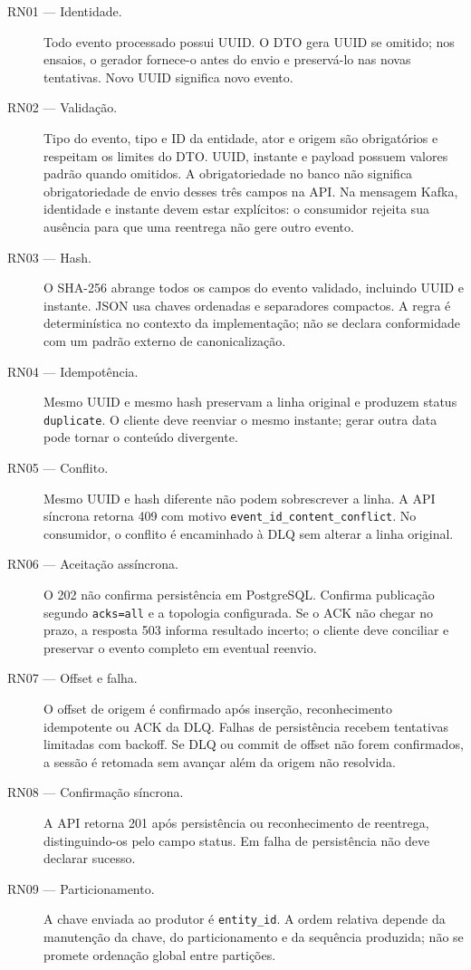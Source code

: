 \begin{description}
\item[RN01 --- Identidade.] Todo evento processado possui UUID. O DTO gera UUID se omitido; nos ensaios, o gerador fornece-o antes do envio e preservá-lo nas novas tentativas. Novo UUID significa novo evento.
\item[RN02 --- Validação.] Tipo do evento, tipo e ID da entidade, ator e origem são obrigatórios e respeitam os limites do DTO. UUID, instante e payload possuem valores padrão quando omitidos. A obrigatoriedade no banco não significa obrigatoriedade de envio desses três campos na API. Na mensagem Kafka, identidade e instante devem estar explícitos: o consumidor rejeita sua ausência para que uma reentrega não gere outro evento.
\item[RN03 --- Hash.] O SHA-256 abrange todos os campos do evento validado, incluindo UUID e instante. JSON usa chaves ordenadas e separadores compactos. A regra é determinística no contexto da implementação; não se declara conformidade com um padrão externo de canonicalização.
\item[RN04 --- Idempotência.] Mesmo UUID e mesmo hash preservam a linha original e produzem status \texttt{duplicate}. O cliente deve reenviar o mesmo instante; gerar outra data pode tornar o conteúdo divergente.
\item[RN05 --- Conflito.] Mesmo UUID e hash diferente não podem sobrescrever a linha. A API síncrona retorna 409 com motivo \texttt{event\_id\_content\_conflict}. No consumidor, o conflito é encaminhado à DLQ sem alterar a linha original.
\item[RN06 --- Aceitação assíncrona.] O 202 não confirma persistência em PostgreSQL. Confirma publicação segundo \texttt{acks=all} e a topologia configurada. Se o ACK não chegar no prazo, a resposta 503 informa resultado incerto; o cliente deve conciliar e preservar o evento completo em eventual reenvio.
\item[RN07 --- Offset e falha.] O offset de origem é confirmado após inserção, reconhecimento idempotente ou ACK da DLQ. Falhas de persistência recebem tentativas limitadas com backoff. Se DLQ ou commit de offset não forem confirmados, a sessão é retomada sem avançar além da origem não resolvida.
\item[RN08 --- Confirmação síncrona.] A API retorna 201 após persistência ou reconhecimento de reentrega, distinguindo-os pelo campo status. Em falha de persistência não deve declarar sucesso.
\item[RN09 --- Particionamento.] A chave enviada ao produtor é \texttt{entity\_id}. A ordem relativa depende da manutenção da chave, do particionamento e da sequência produzida; não se promete ordenação global entre partições.

\end{description}
